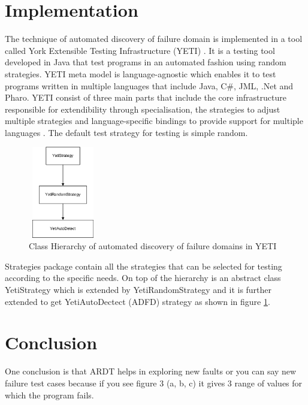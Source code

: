 \documentclass{acm_proc_article-sp}
\begin{document}

\section{Implementation}
 The technique of automated discovery of failure domain is implemented in a tool called York Extensible Testing Infrastructure (YETI) \cite{Oriol2010a}. It is a testing tool developed in Java that test programs in an automated fashion using random strategies. YETI meta model is language-agnostic which enables it to test programs written in multiple languages that include Java, C\#, JML, .Net and Pharo. YETI consist of three main parts that include the core infrastructure responsible for extendibility through specialisation, the strategies to adjust multiple strategies and language-specific bindings to provide support for multiple languages \cite{Oriol2010}. The default test strategy for testing is simple random.

\begin{figure}[htp]
\centering
\includegraphics[width=3cm,height=4cm]{Hierarchy1.png}
\caption{Class Hierarchy of automated discovery of failure domains in YETI}
\label{fig:hierarchy}
\end{figure}

Strategies package contain all the strategies that can be selected for testing according to the specific needs. On top of the hierarchy is an abstract class YetiStrategy which is extended by YetiRandomStrategy and it is further extended to get YetiAutoDectect (ADFD) strategy as shown in figure \ref{fig:hierarchy}. 





\section{Conclusion}
One conclusion is that ARDT helps in exploring new faults or you can say new failure test cases because if you see figure 3 (a, b, c) it gives 3 range of values for which the program fails. \\
\end{document}
